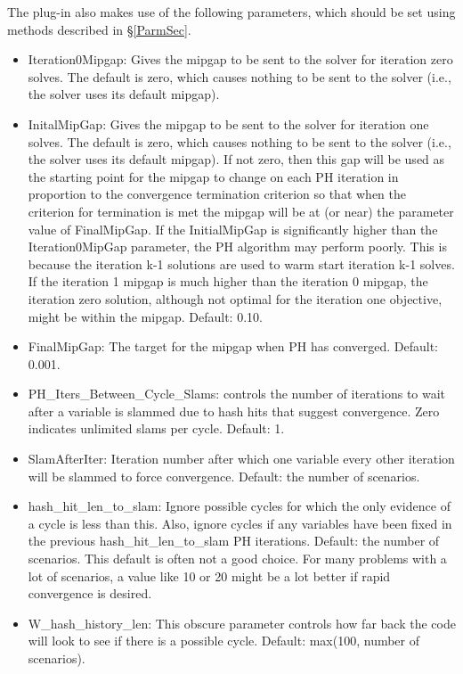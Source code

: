The plug-in also makes use of the following parameters, which should be set using methods described in \S\ref{ParmSec}.
\begin{itemize}
\item Iteration0Mipgap: Gives the mipgap to be sent to the solver for iteration zero solves. The default is zero, which causes nothing to be sent to the solver (i.e., the solver uses its default mipgap).
\item InitalMipGap: Gives the mipgap to be sent to the solver for iteration one solves. The default is zero, which causes nothing to be sent to the solver (i.e., the solver uses its default mipgap). If not zero, then this gap will be used as the starting point for the mipgap to change on each PH iteration in proportion to the convergence termination criterion so that when the criterion for termination is met
the mipgap will be at (or near) the parameter value of FinalMipGap. If the InitialMipGap is significantly higher than the Iteration0MipGap parameter, the PH algorithm may
perform poorly. This is because the iteration k-1 solutions are used to warm start iteration k-1 solves. If the iteration 1 mipgap is much higher than the iteration 0 mipgap, the iteration zero
solution, although not optimal for the iteration one objective, might be within the mipgap. Default: 0.10.
\item FinalMipGap: The target for the mipgap when PH has converged. Default: 0.001.
\item PH\_Iters\_Between\_Cycle\_Slams: controls the number of iterations to wait after a variable is slammed due to 
hash hits that suggest convergence. Zero indicates unlimited slams per cycle. Default: 1.
\item SlamAfterIter: Iteration number after which one variable every other iteration will be slammed to force convergence. Default: the number of scenarios.
\item hash\_hit\_len\_to\_slam: Ignore possible cycles for which the only evidence of a cycle is less than this. Also, ignore cycles if any variables have been fixed in the previous hash\_hit\_len\_to\_slam PH iterations. Default:
the number of scenarios. This default is often not a good choice. For many problems with a lot of scenarios,
a value like 10 or 20 might be a lot better if rapid convergence is desired.
\item W\_hash\_history\_len: This obscure parameter controls how far back the code will look to see if there is a possible cycle. Default: max(100, number of scenarios).
\end{itemize}

